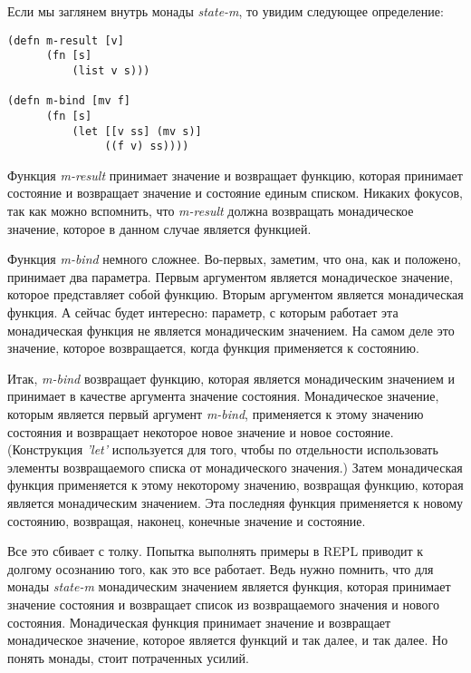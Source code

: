 \documentclass[a4paper,12pt]{article}
\newcommand{\cl}[1] {{\it #1}}
\begin{document}

Если мы заглянем внутрь монады \cl{state-m}, то увидим следующее определение:

\begin{verbatim}
(defn m-result [v]
      (fn [s]
          (list v s)))

(defn m-bind [mv f]
      (fn [s]
          (let [[v ss] (mv s)]
               ((f v) ss))))
\end{verbatim}

Функция \cl{m-result} принимает значение и возвращает функцию, которая принимает состояние и 
возвращает значение и состояние единым списком. Никаких фокусов, так как можно вспомнить, что
\cl{m-result} должна возвращать монадическое значение, которое в данном случае является функцией. 

Функция \cl{m-bind} немного сложнее. Во-первых, заметим, что она, как и положено, принимает два
параметра. Первым аргументом является монадическое значение, которое представляет собой функцию. 
Вторым аргументом является монадическая функция. А сейчас будет интересно: параметр, с которым работает 
эта монадическая функция не является монадическим значением. На самом деле это значение, которое 
возвращается, когда функция применяется к состоянию. 

Итак, \cl{m-bind} возвращает функцию, которая является монадическим значением и принимает в качестве
аргумента значение состояния. Монадическое значение, которым является первый аргумент \cl{m-bind},
применяется к этому значению состояния и возвращает некоторое новое значение и новое состояние. 
(Конструкция \cl{'let'} используется для того, чтобы по отдельности использовать элементы возвращаемого
списка от монадического значения.) Затем монадическая функция применяется к этому некоторому значению, 
возвращая функцию, которая является монадическим значением. Эта последняя функция применяется к
новому состоянию, возвращая, наконец, конечные значение и состояние. 

Все это сбивает с толку. Попытка выполнять примеры в REPL приводит к долгому осознанию того, как это
все работает. Ведь нужно помнить, что для монады \cl{state-m} монадическим значением является функция, которая
принимает значение состояния и возвращает список из возвращаемого значения и нового состояния. Монадическая
функция принимает значение и возвращает монадическое значение, которое является функций и так далее, и так далее.
Но понять монады, стоит потраченных усилий.
\end{document}
